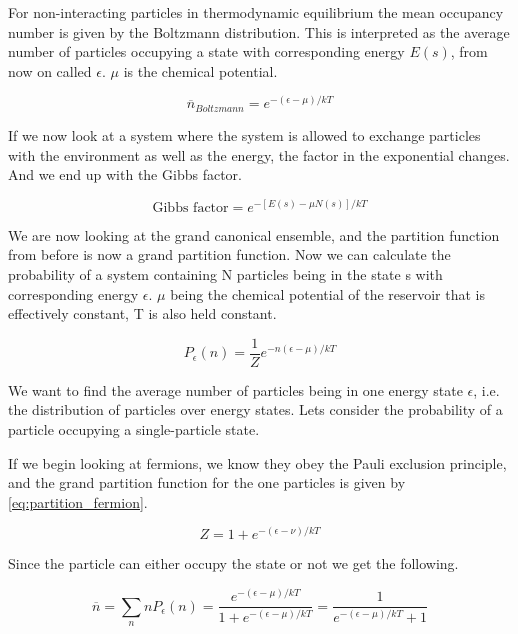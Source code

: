 For non-interacting particles in thermodynamic equilibrium the mean occupancy number is given by the Boltzmann distribution. This is interpreted as the average number of particles occupying a state with corresponding energy $E(s)$, from now on called $\epsilon$. $\mu$ is the chemical potential.

\begin{equation}
\overline{n}_{Boltzmann} = e^{-(\epsilon - \mu)/kT}
\end{equation}

If we now look at a system where the system is allowed to exchange particles with the environment as well as the energy, the factor in the exponential changes. And we end up with the Gibbs factor. 

\begin{equation}
\text{Gibbs factor} = e^{-[E(s) - \mu N(s)]/kT}
\end{equation}

We are now looking at the grand canonical ensemble, and the partition function from before is now a grand partition function.
Now we can calculate the probability of a system containing N particles being in the state s with corresponding energy $\epsilon$.
$\mu$ being the chemical potential of the reservoir that is effectively constant, T is also held constant.

\begin{equation}
P_{\epsilon}(n) = \frac{1}{Z} e^{-n(\epsilon - \mu)/kT}
\end{equation}

We want to find the average number of particles being in one energy state $\epsilon$, i.e. the distribution of particles over energy states. Lets consider the probability of a particle occupying a single-particle state. 

If we begin looking at fermions, we know they obey the Pauli exclusion principle, and the grand partition function for the one particles is given by \eqref{eq:partition_fermion}.

\begin{equation} \label{eq:partition_fermion}
Z = 1 + e^{-(\epsilon - \nu)/kT}
\end{equation}

Since the particle can either occupy the state or not we get the following.

\begin{equation}
\overline{n} = \sum_n n P_{\epsilon}(n) = \frac{e^{-(\epsilon - \mu)/kT}}{ 1 + e^{-(\epsilon - \mu)/kT}} = \frac{1}{e^{-(\epsilon - \mu)/kT} + 1}
\end{equation}

